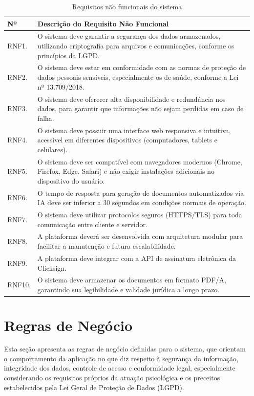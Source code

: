 \begin{table}[H]
\centering
\caption{Requisitos não funcionais do sistema}
\begin{tabular}{@{}lp{13cm}@{}}
\toprule
\rowcolor[HTML]{EFEFEF} 
\textbf{Nº} & \textbf{Descrição do Requisito Não Funcional} \\ \midrule
RNF1.  & O sistema deve garantir a segurança dos dados armazenados, utilizando criptografia para arquivos e comunicações, conforme os princípios da LGPD. \\
RNF2.  & O sistema deve estar em conformidade com as normas de proteção de dados pessoais sensíveis, especialmente os de saúde, conforme a Lei nº 13.709/2018. \\
RNF3.  & O sistema deve oferecer alta disponibilidade e redundância nos dados, para garantir que informações não sejam perdidas em caso de falha. \\
RNF4.  & O sistema deve possuir uma interface web responsiva e intuitiva, acessível em diferentes dispositivos (computadores, tablets e celulares). \\
RNF5.  & O sistema deve ser compatível com navegadores modernos (Chrome, Firefox, Edge, Safari) e não exigir instalações adicionais no dispositivo do usuário. \\
RNF6.  & O tempo de resposta para geração de documentos automatizados via IA deve ser inferior a 30 segundos em condições normais de operação. \\
RNF7.  & O sistema deve utilizar protocolos seguros (HTTPS/TLS) para toda comunicação entre cliente e servidor. \\
RNF8.  & A plataforma deverá ser desenvolvida com arquitetura modular para facilitar a manutenção e futura escalabilidade. \\
RNF9.  & A plataforma deve integrar com a API de assinatura eletrônica da Clicksign. \\
RNF10. & O sistema deve armazenar os documentos em formato PDF/A, garantindo sua legibilidade e validade jurídica a longo prazo. \\
\bottomrule
\end{tabular}
\label{tab:req-nao-funcionais}
\end{table}

\section{Regras de Negócio}

Esta seção apresenta as regras de negócio definidas para o sistema, que orientam o comportamento da aplicação no que diz respeito à segurança da informação, integridade dos dados, controle de acesso e conformidade legal, especialmente considerando os requisitos próprios da atuação psicológica e os preceitos estabelecidos pela Lei Geral de Proteção de Dados (LGPD).

